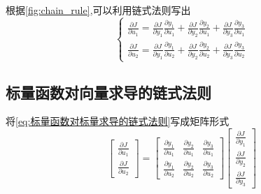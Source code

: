 \documentclass[withoutpreface,bwprint]{NoteBook}
\begin{document}
根据\cref{fig:chain_rule},可以利用链式法则写出
\begin{equation}
    \label{eq:标量函数对标量求导的链式法则}
    \begin{cases}
        \frac{\partial J}{\partial u_1} = \frac{\partial J}{\partial y_1} \frac{\partial y_1}{\partial u_1} + \frac{\partial J}{\partial y_2} \frac{\partial y_2}{\partial u_1} +\frac{\partial J}{\partial y_3} \frac{\partial y_3}{\partial u_1} \\
        \frac{\partial J}{\partial u_2} = \frac{\partial J}{\partial y_1} \frac{\partial y_1}{\partial u_2} + \frac{\partial J}{\partial y_2} \frac{\partial y_2}{\partial u_2} +\frac{\partial J}{\partial y_3} \frac{\partial y_3}{\partial u_2} 
    \end{cases}    
\end{equation}

\subsection{标量函数对向量求导的链式法则}

将\cref{eq:标量函数对标量求导的链式法则}写成矩阵形式
\begin{equation}
    \label{eq:标量函数对标量求导的链式法则变成矩阵形式}
    \begin{bmatrix}
        \frac{\partial J}{\partial u_1}\\
        \frac{\partial J}{\partial u_2}
    \end{bmatrix}
    =
    \begin{bmatrix}
        \frac{\partial y_1}{\partial u_1} & \frac{\partial y_2}{\partial u_1} & \frac{\partial y_3}{\partial u_1}  \\
        \frac{\partial y_1}{\partial u_2} &  \frac{\partial y_2}{\partial u_2} &  \frac{\partial y_3}{\partial u_2}
    \end{bmatrix}
    \begin{bmatrix}
        \frac{\partial J}{\partial y_1} \\
        \frac{\partial J}{\partial y_2} \\
        \frac{\partial J}{\partial y_3}
    \end{bmatrix}
\end{equation}
\end{document}

